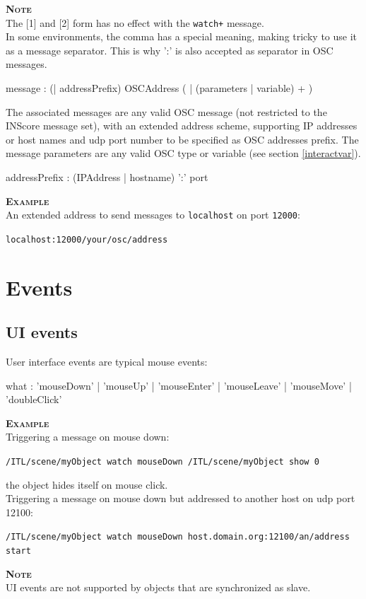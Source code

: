 \documentclass[a4paper,twoside]{report}
\newcommand{\sublevel}[1]	{\section{#1}}
\newcommand{\subsublevel}[1]	{\subsection{#1}}
\newcommand{\OSC}[1]		{\texttt{#1}}
\newcommand{\example}		{\textbf{\hspace{-1.5cm}\textbf{\textsc{Example }}}}
\newcommand{\note}	[1]		{\vspace{2mm}\textbf{\hspace{-1.03cm}\textbf{\textsc{Note #1}}}}
\newcommand{\sample}	[1]			{\vspace{-2mm}\begin{center}\colorbox{mygrey}{
								\begin{minipage}[t]{0.9\columnwidth} 
								{\small \texttt{#1}}
								\end{minipage}}\end{center}}
\newcommand{\sampleindent}	{ \hspace{0.5cm} }
\begin{document}
\note{} \\
	The [1] and [2] form has no effect with the \OSC{watch+} message. \\
	In some environments, the comma has a special meaning, making tricky to use it as a message separator. This is why ':' is also accepted as separator in OSC messages.

\begin{rail} 
message : (| addressPrefix)  OSCAddress ( | (parameters | variable) + )
\end{rail}

The associated messages are any valid OSC message (not restricted to the INScore message set), with an extended address scheme, supporting IP addresses or host names and udp port number to be specified as OSC addresses prefix. The message parameters are any valid OSC type or variable (see section \ref{interactvar}).


\begin{rail} 
addressPrefix : (IPAddress | hostname) ':' port
\end{rail}

\example \\
An extended address to send messages to \OSC{localhost} on port \OSC{12000}:
\sample{localhost:12000/your/osc/address}

\sublevel{Events}
\label{defevents}


\subsublevel{UI events}
\label{uievents}

User interface events are typical mouse events:
\begin{rail}
what : 'mouseDown' | 'mouseUp' | 'mouseEnter' | 'mouseLeave' | 'mouseMove' | 'doubleClick' 
\end{rail}
	
\example \\
Triggering a message on mouse down:
\sample{/ITL/scene/myObject watch mouseDown /ITL/scene/myObject show 0}
\sampleindent the object hides itself on mouse click. \\
Triggering a message on mouse down but addressed to another host on udp port 12100:
\sample{/ITL/scene/myObject watch mouseDown host.domain.org:12100/an/address start }

\note{} \\
UI events are not supported by objects that are synchronized as slave.
\end{document}

